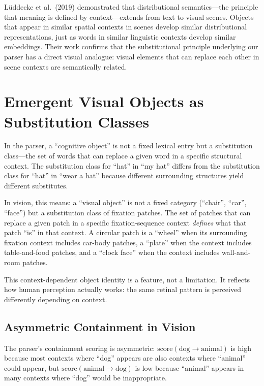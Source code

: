 \documentclass[11pt,a4paper]{article}
\begin{document}
L\"{u}ddecke et al.\ (2019) demonstrated that distributional semantics---the principle that meaning is defined by context---extends from text to visual scenes. Objects that appear in similar spatial contexts in scenes develop similar distributional representations, just as words in similar linguistic contexts develop similar embeddings. Their work confirms that the substitutional principle underlying our parser has a direct visual analogue: visual elements that can replace each other in scene contexts are semantically related.

\section{Emergent Visual Objects as Substitution Classes}

In the parser, a ``cognitive object'' is not a fixed lexical entry but a substitution class---the set of words that can replace a given word in a specific structural context. The substitution class for ``hat'' in ``my hat'' differs from the substitution class for ``hat'' in ``wear a hat'' because different surrounding structures yield different substitutes.

In vision, this means: a ``visual object'' is not a fixed category (``chair'', ``car'', ``face'') but a substitution class of fixation patches. The set of patches that can replace a given patch in a specific fixation-sequence context \textit{defines} what that patch ``is'' in that context. A circular patch is a ``wheel'' when its surrounding fixation context includes car-body patches, a ``plate'' when the context includes table-and-food patches, and a ``clock face'' when the context includes wall-and-room patches.

This context-dependent object identity is a feature, not a limitation. It reflects how human perception actually works: the same retinal pattern is perceived differently depending on context.

\subsection{Asymmetric Containment in Vision}

The parser's containment scoring is asymmetric: $\text{score}(\text{dog} \to \text{animal})$ is high because most contexts where ``dog'' appears are also contexts where ``animal'' could appear, but $\text{score}(\text{animal} \to \text{dog})$ is low because ``animal'' appears in many contexts where ``dog'' would be inappropriate.
\end{document}
